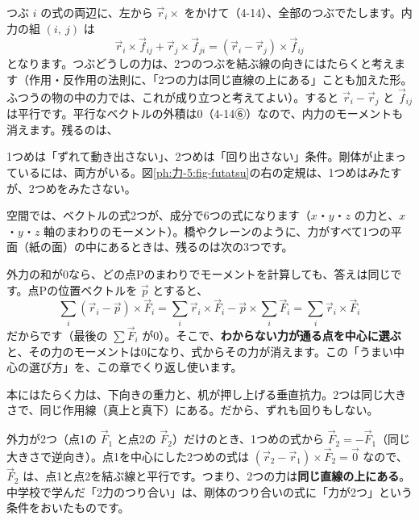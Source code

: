 つぶ $i$ の式の両辺に、左から $\vec r_i\times$ をかけて（4-14）、全部のつぶでたします。内力の組 $(i,\ j)$ は
\[ \vec r_i\times\vec f_{ij}+\vec r_j\times\vec f_{ji}=(\vec r_i-\vec r_j)\times\vec f_{ij} \]
となります。つぶどうしの力は、2つのつぶを結ぶ線の向きにはたらくと考えます（作用・反作用の法則に、「2つの力は同じ直線の上にある」ことも加えた形。ふつうの物の中の力では、これが成り立つと考えてよい）。すると $\vec r_i-\vec r_j$ と $\vec f_{ij}$ は平行です。平行なベクトルの外積は0（4-14⑥）なので、内力のモーメントも消えます。残るのは、\label{ph:力-5:goutai}

\begin{phyomi}[$\sum\vec F=\vec 0$、$\sum\vec N=\vec 0$]
1つめは「ずれて動き出さない」、2つめは「回り出さない」条件。剛体が止まっているには、両方がいる。図\ref{ph:力-5:fig-futatsu}の右の定規は、1つめはみたすが、2つめをみたさない。
\end{phyomi}

\noindent 空間では、ベクトルの式2つが、成分で6つの式になります（$x$・$y$・$z$ の力と、$x$・$y$・$z$ 軸のまわりのモーメント）。橋やクレーンのように、力がすべて1つの平面（紙の面）の中にあるときは、残るのは次の3つです。

外力の和が0なら、どの点Pのまわりでモーメントを計算しても、答えは同じです。点Pの位置ベクトルを $\vec p$ とすると、
\[ \sum_i(\vec r_i-\vec p)\times\vec F_i=\sum_i\vec r_i\times\vec F_i-\vec p\times\sum_i\vec F_i=\sum_i\vec r_i\times\vec F_i \]
だからです（最後の $\sum\vec F_i$ が0）。そこで、\textbf{わからない力が通る点を中心に選ぶ}と、その力のモーメントは0になり、式からその力が消えます。この「うまい中心の選び方」を、この章でくり返し使います。

\begin{phmijika}[机の上の本]
本にはたらく力は、下向きの重力と、机が押し上げる垂直抗力。2つは同じ大きさで、同じ作用線（真上と真下）にある。だから、ずれも回りもしない。
\end{phmijika}

\label{ph:力-5:niryoku}外力が2つ（点1の $\vec F_1$ と点2の $\vec F_2$）だけのとき、1つめの式から $\vec F_2=-\vec F_1$（同じ大きさで逆向き）。点1を中心にした2つめの式は $(\vec r_2-\vec r_1)\times\vec F_2=\vec 0$ なので、$\vec F_2$ は、点1と点2を結ぶ線と平行です。つまり、2つの力は\textbf{同じ直線の上にある}。中学校で学んだ「2力のつり合い」は、剛体のつり合いの式に「力が2つ」という条件をおいたものです。

